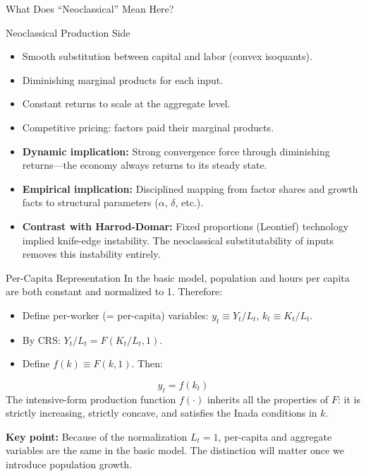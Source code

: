 \documentclass[aspectratio=169,10pt]{beamer}
\newcommand{\apxbutton}[1]{\hfill\hyperlink{#1}{\beamerbutton{Appendix}}}
\begin{document}
\begin{frame}{What Does ``Neoclassical'' Mean Here?}
\begin{block}{Neoclassical Production Side}
\begin{itemize}
  \item Smooth substitution between capital and labor (convex isoquants).
  \item Diminishing marginal products for each input.
  \item Constant returns to scale at the aggregate level.
  \item Competitive pricing: factors paid their marginal products.
\end{itemize}
\end{block}
\begin{itemize}
  \item \textbf{Dynamic implication:} Strong convergence force through diminishing returns---the economy always returns to its steady state.
  \item \textbf{Empirical implication:} Disciplined mapping from factor shares and growth facts to structural parameters ($\alpha$, $\delta$, etc.).
  \item \textbf{Contrast with Harrod-Domar:} Fixed proportions (Leontief) technology implied knife-edge instability. The neoclassical substitutability of inputs removes this instability entirely.
\end{itemize}
\end{frame}

\begin{frame}{Per-Capita Representation}
\hypertarget{m-a1}{}
In the basic model, population and hours per capita are both constant and normalized to 1. Therefore:
\begin{itemize}
  \item Define per-worker (= per-capita) variables: $y_t \equiv Y_t/L_t$, $k_t \equiv K_t/L_t$.
  \item By CRS: $Y_t/L_t = F(K_t/L_t, 1)$.
  \item Define $f(k) \equiv F(k,1)$. Then:
\end{itemize}
\[
y_t = f(k_t) \tag{3.1}
\]
The intensive-form production function $f(\cdot)$ inherits all the properties of $F$: it is strictly increasing, strictly concave, and satisfies the Inada conditions in $k$.

\medskip
\textbf{Key point:} Because of the normalization $L_t=1$, per-capita and aggregate variables are the same in the basic model. The distinction will matter once we introduce population growth.
\apxbutton{a1}
\end{frame}
\end{document}
